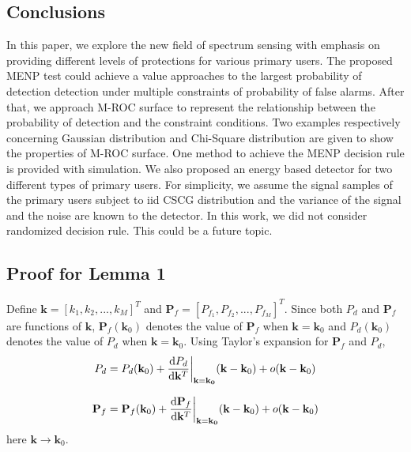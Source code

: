 \documentclass[12pt,journal,a4paper,twoside,onecolumn]{IEEEtran}
\begin{document}
\begin{spacing}{2.5}
\section{Conclusions}
In this paper, we explore the new field of spectrum sensing with emphasis on providing different levels of protections for various primary users. 
The proposed MENP test could achieve a value approaches to the largest probability of detection detection under multiple constraints of probability of false alarms. 
After that, we approach M-ROC surface to represent the relationship between the probability of detection and the constraint conditions. Two examples respectively concerning Gaussian distribution and Chi-Square distribution are given to show the properties of M-ROC surface. 
One method to achieve the MENP decision rule is provided with simulation. 
We also proposed an energy based detector for two different types of primary users.
For simplicity, we assume the signal samples of the primary users subject to iid CSCG distribution and the variance of the signal and the noise are known to the detector.
In this work, we did not consider randomized decision rule. This could be a future topic.


\appendix
\subsection{Proof for Lemma 1}

Define $\mathbf{k} = [k_1, k_2, ..., k_M]^T$ and $\mathbf{P}_f = [P_{f_1}, P_{f_2}, ..., P_{f_M}]^T$. Since both $P_d$ and $\mathbf{P}_f$ are functions of $\mathbf{k}$, $\mathbf{P}_f(\mathbf{k}_0)$ denotes the value of $\mathbf{P}_f$ when $\mathbf{k} = \mathbf{k}_0$ and $P_d(\mathbf{k}_0)$ denotes the value of $P_d$ when $\mathbf{k} = \mathbf{k}_0$. Using Taylor's expansion for $\mathbf{P}_f$ and $P_d$,
\begin{equation}
\label{pro: pd}
P_d = P_d(\mathbf{k}_0) + \frac{\mathrm{d}P_d}{\mathrm{d}\mathbf{k}^T}\bigg{|}_{\mathbf{k}=\mathbf{k_0}}(\mathbf{k} - \mathbf{k}_0)
+ o(\mathbf{k} - \mathbf{k}_0)
\end{equation}

\begin{equation}
\label{pro: pf}
\mathbf{P}_f = \mathbf{P}_f(\mathbf{k}_0) + \frac{\mathrm{d}\mathbf{P}_f}{\mathrm{d}\mathbf{k}^T}\bigg{|}_{\mathbf{k}=\mathbf{k_0}}(\mathbf{k} - \mathbf{k}_0)
+ o(\mathbf{k} - \mathbf{k}_0)
\end{equation}
here $\mathbf{k} \rightarrow \mathbf{k}_0$.


\end{spacing}
\end{document}
